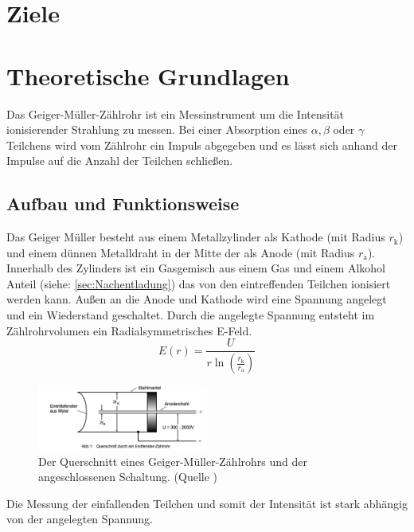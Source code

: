 \section{Ziele}
\label{sec:Ziele}
\section{Theoretische Grundlagen}
\label{sec:Theorie}
Das Geiger-Müller-Zählrohr ist ein Messinstrument um die Intensität ionisierender Strahlung zu messen.
Bei einer Absorption eines $\alpha , \beta$ oder $\gamma$ Teilchens wird vom Zählrohr ein Impuls abgegeben und es lässt sich anhand der Impulse auf die Anzahl der Teilchen schließen.
\subsection{Aufbau und Funktionsweise}
\label{sec:Funktion}
Das Geiger Müller besteht aus einem Metallzylinder als Kathode (mit Radius $r_{\text{k}}$) und einem dünnen Metalldraht in der Mitte der als Anode (mit Radius $r_{\text{a}}$).
Innerhalb des Zylinders ist ein Gasgemisch aus einem Gas und einem Alkohol Anteil (siehe: \ref{sec:Nachentladung}) das von den eintreffenden Teilchen ionisiert werden kann.
Außen an die Anode und Kathode wird eine Spannung angelegt und ein Wiederstand geschaltet.
Durch die angelegte Spannung entsteht im Zählrohrvolumen ein Radialsymmetrisches E-Feld.
\begin{equation}
    E(r) = \frac{U}{r \ln\left(\frac{r_{\text{k}}}{r_{\text{a}}}\right)} \nonumber
\end{equation}
\begin{figure}
    \centering
    \includegraphics[width=0.5\textwidth]{bilder/Zaehlrohr_Querschnitt.png}
    \caption{Der Querschnitt eines Geiger-Müller-Zählrohrs und der angeschlossenen Schaltung. (Quelle \cite{Anleitung})}
    \label{fig:Zaehlrohr}
\end{figure}
Die Messung der einfallenden Teilchen und somit der Intensität ist stark abhängig von der angelegten Spannung.
